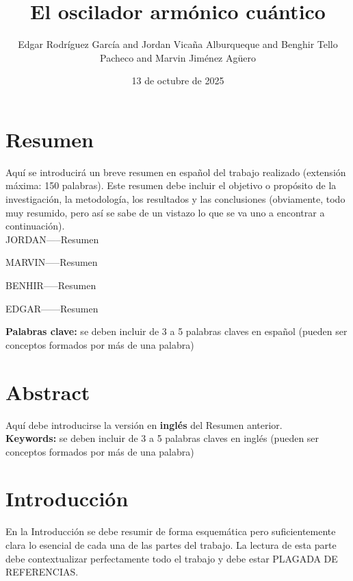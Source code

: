 \documentclass[11pt,a4paper,spanish]{book}
\title{El oscilador armónico cuántico}
\author{Edgar Rodríguez García and Jordan Vicaña Alburqueque and Benghir Tello Pacheco and Marvin Jiménez Agüero}
\date{13 de octubre de 2025}
\begin{document}
\renewcommand{\listfigurename}{Índice de figuras}
\renewcommand{\listtablename}{Índice de tablas}
\renewcommand{\contentsname}{Índice de contenidos}
\renewcommand{\figurename}{Figura}
\renewcommand{\tablename}{Tabla} 

\maketitle
\frontmatter
\tableofcontents
\listoffigures %
\listoftables %

\chapter{Resumen}
Aquí se introducirá un breve resumen en español del trabajo realizado (extensión máxima: 150 palabras). Este resumen debe incluir el objetivo o propósito de la investigación, la metodología, los resultados y las conclusiones (obviamente, todo muy resumido, pero así se sabe de un vistazo lo que se va uno a encontrar a continuación).\\

JORDAN-----Resumen

MARVIN-----Resumen

BENHIR-----Resumen

EDGAR------Resumen


{\bf Palabras clave:} se deben incluir de 3 a 5 palabras claves en español (pueden ser conceptos formados por más de una palabra)


\chapter{Abstract}
Aquí debe introducirse la versión en {\bf inglés} del Resumen anterior.\\


{\bf Keywords:} se deben incluir de 3 a 5 palabras claves en inglés  (pueden ser conceptos formados por más de una palabra)




\mainmatter
\chapter{Introducción}

En la Introducción se debe resumir de forma esquemática pero suficientemente clara lo esencial de cada una de las partes del trabajo. La lectura de esta parte debe contextualizar perfectamente todo el trabajo y debe estar PLAGADA DE REFERENCIAS.\\
\end{document}

